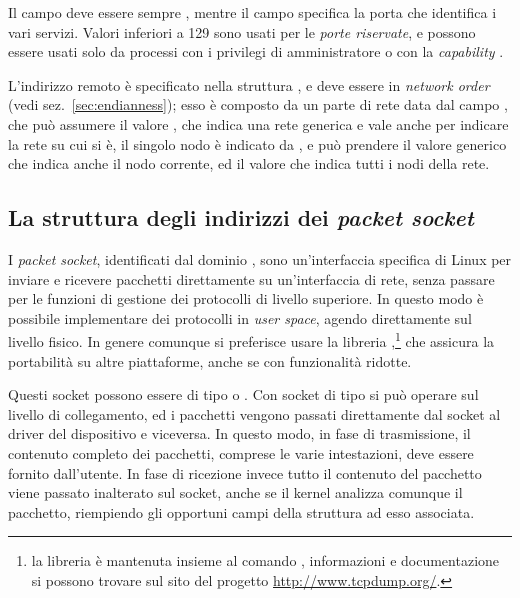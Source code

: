 Il campo  deve essere sempre , mentre
il campo  specifica la porta che identifica i vari
servizi. Valori inferiori a 129 sono usati per le \textsl{porte riservate}, e
possono essere usati solo da processi con i privilegi di amministratore o con
la \textit{capability} .  

L'indirizzo remoto è specificato nella struttura , e deve
essere in \textit{network order} (vedi sez.~\ref{sec:endianness}); esso è
composto da un parte di rete data dal campo , che può assumere il
valore , che indica una rete generica e vale anche per
indicare la rete su cui si è, il singolo nodo è indicato da , e
può prendere il valore generico  che indica anche il nodo
corrente, ed il valore  che indica tutti i nodi della
rete.


\subsection{La struttura degli indirizzi dei \textit{packet socket}}
\label{sec:sock_sa_packet}

I \textit{packet socket}, identificati dal dominio , sono
un'interfaccia specifica di Linux per inviare e ricevere pacchetti
direttamente su un'interfaccia di rete, senza passare per le funzioni di
gestione dei protocolli di livello superiore. In questo modo è possibile
implementare dei protocolli in \textit{user space}, agendo direttamente sul
livello fisico. In genere comunque si preferisce usare la libreria
,\footnote{la libreria è mantenuta insieme al comando
  , informazioni e documentazione si possono trovare sul sito del
  progetto \url{http://www.tcpdump.org/}.}  che assicura la portabilità su
altre piattaforme, anche se con funzionalità ridotte.

Questi socket possono essere di tipo  o .
Con socket di tipo  si può operare sul livello di
collegamento, ed i pacchetti vengono passati direttamente dal socket al driver
del dispositivo e viceversa.  In questo modo, in fase di trasmissione, il
contenuto completo dei pacchetti, comprese le varie intestazioni, deve essere
fornito dall'utente. In fase di ricezione invece tutto il contenuto del
pacchetto viene passato inalterato sul socket, anche se il kernel analizza
comunque il pacchetto, riempiendo gli opportuni campi della struttura
 ad esso associata.

